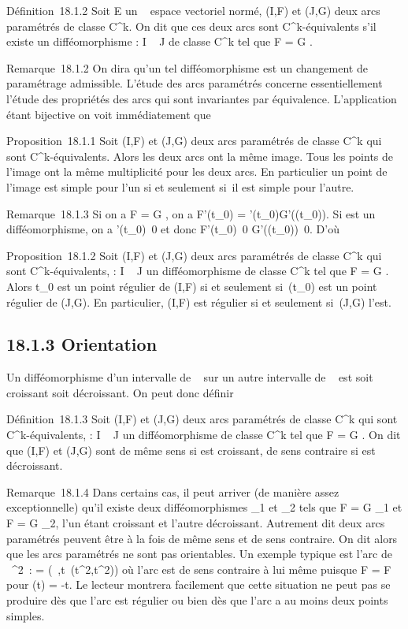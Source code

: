 \documentclass[]{article}
\begin{document}
Définition~18.1.2 Soit E un ~ espace vectoriel normé, (I,F) et (J,G)
deux arcs paramétrés de classe C^k. On dit que ces deux arcs
sont C^k-équivalents s'il existe un difféomorphisme \theta : I \rightarrow~ J
de classe C^k tel que F = G \cdot \theta.

Remarque~18.1.2 On dira qu'un tel difféomorphisme est un changement de
paramétrage admissible. L'étude des arcs paramétrés concerne
essentiellement l'étude des propriétés des arcs qui sont invariantes par
équivalence. L'application \theta étant bijective on voit immédiatement que

Proposition~18.1.1 Soit (I,F) et (J,G) deux arcs paramétrés de classe
C^k qui sont C^k-équivalents. Alors les deux arcs
ont la même image. Tous les points de l'image ont la même multiplicité
pour les deux arcs. En particulier un point de l'image est simple pour
l'un si et seulement si~il est simple pour l'autre.

Remarque~18.1.3 Si on a F = G \cdot \theta, on a F'(t_0) =
\theta'(t_0)G'(\theta(t_0)). Si \theta est un difféomorphisme, on a
\theta'(t_0)\neq~0 et donc
F'(t_0)\neq~0
\Leftrightarrow
G'(\theta(t_0))\neq~0. D'où

Proposition~18.1.2 Soit (I,F) et (J,G) deux arcs paramétrés de classe
C^k qui sont C^k-équivalents, \theta : I \rightarrow~ J un
difféomorphisme de classe C^k tel que F = G \cdot \theta. Alors
t_0 est un point régulier de (I,F) si et seulement
si~\theta(t_0) est un point régulier de (J,G). En particulier, (I,F)
est régulier si et seulement si~(J,G) l'est.

\subsection{18.1.3 Orientation}

Un difféomorphisme d'un intervalle de ~ sur un autre intervalle de ~ est
soit croissant soit décroissant. On peut donc définir

Définition~18.1.3 Soit (I,F) et (J,G) deux arcs paramétrés de classe
C^k qui sont C^k-équivalents, \theta : I \rightarrow~ J un
difféomorphisme de classe C^k tel que F = G \cdot \theta. On dit que
(I,F) et (J,G) sont de même sens si \theta est croissant, de sens contraire
si \theta est décroissant.

Remarque~18.1.4 Dans certains cas, il peut arriver (de manière assez
exceptionnelle) qu'il existe deux difféomorphismes \theta_1 et
\theta_2 tels que F = G \cdot \theta_1 et F = G \cdot \theta_2, l'un
étant croissant et l'autre décroissant. Autrement dit deux arcs
paramétrés peuvent être à la fois de même sens et de sens contraire. On
dit alors que les arcs paramétrés ne sont pas orientables. Un exemple
typique est l'arc de ~^2~: \Gamma =
(~,t\mapsto~(t^2,t^2)) où
l'arc est de sens contraire à lui même puisque F \cdot \theta = F pour \theta(t) = -t.
Le lecteur montrera facilement que cette situation ne peut pas se
produire dès que l'arc est régulier ou bien dès que l'arc a au moins
deux points simples.
\end{document}
